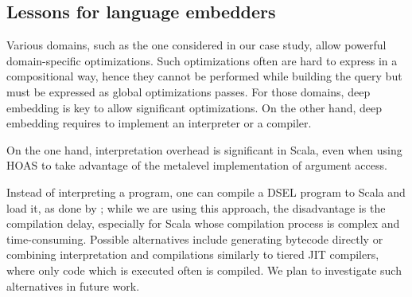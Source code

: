 
\subsection{Lessons for language embedders}
Various domains, such as the one considered in our case study, allow powerful domain-specific optimizations. Such optimizations often are hard to express in a compositional way, hence they cannot be performed while building the query but must be expressed as global optimizations passes.
For those domains, deep embedding is key to allow significant optimizations.
On the other hand, deep embedding requires to implement an interpreter or a compiler.

On the one hand, interpretation overhead is significant in Scala, even when
using HOAS to take advantage of the metalevel implementation of argument access.

Instead of interpreting a program, one can compile a DSEL program to Scala and load it, as done by \citet{Rompf11BBlocks};
while we are using this approach, the disadvantage is the compilation delay,
especially for Scala whose compilation process is complex and time-consuming.
Possible alternatives include generating bytecode directly or combining
interpretation and compilations similarly to tiered JIT compilers, where only
code which is executed often is compiled. We plan to investigate such
alternatives in future work.


